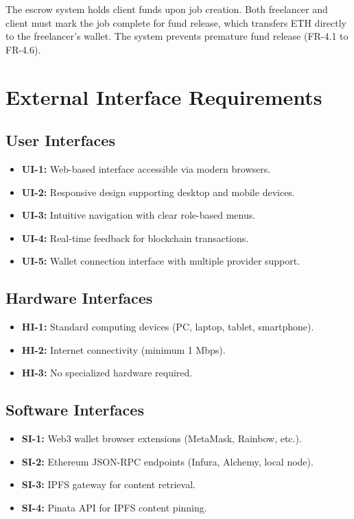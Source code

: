 The escrow system holds client funds upon job creation. Both freelancer and client must mark the job complete for fund release, which transfers ETH directly to the freelancer's wallet. The system prevents premature fund release (FR-4.1 to FR-4.6).

\section{External Interface Requirements}

\subsection{User Interfaces}

\begin{itemize}
    \item \textbf{UI-1:} Web-based interface accessible via modern browsers.
    \item \textbf{UI-2:} Responsive design supporting desktop and mobile devices.
    \item \textbf{UI-3:} Intuitive navigation with clear role-based menus.
    \item \textbf{UI-4:} Real-time feedback for blockchain transactions.
    \item \textbf{UI-5:} Wallet connection interface with multiple provider support.
\end{itemize}

\subsection{Hardware Interfaces}

\begin{itemize}
    \item \textbf{HI-1:} Standard computing devices (PC, laptop, tablet, smartphone).
    \item \textbf{HI-2:} Internet connectivity (minimum 1 Mbps).
    \item \textbf{HI-3:} No specialized hardware required.
\end{itemize}

\subsection{Software Interfaces}

\begin{itemize}
    \item \textbf{SI-1:} Web3 wallet browser extensions (MetaMask, Rainbow, etc.).
    \item \textbf{SI-2:} Ethereum JSON-RPC endpoints (Infura, Alchemy, local node).
    \item \textbf{SI-3:} IPFS gateway for content retrieval.
    \item \textbf{SI-4:} Pinata API for IPFS content pinning.
\end{itemize}

